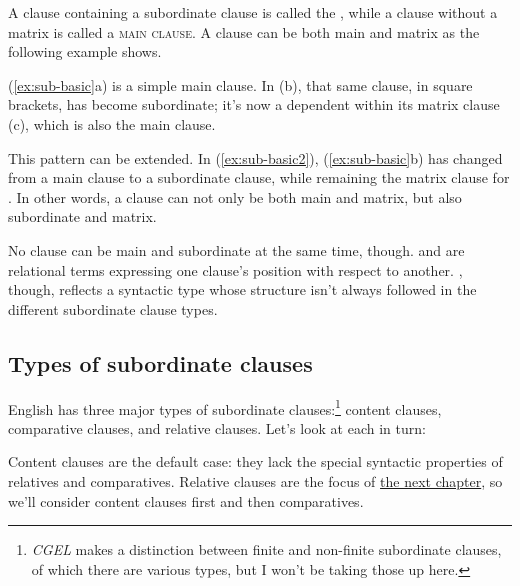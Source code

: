 A clause containing a subordinate clause is called the , while a clause without a matrix is called a \textsc{main clause.} A clause can be both main and matrix as the following example shows.

\ea \label{ex:sub-basic}
    \z
\z
(\ref{ex:sub-basic}a) is a simple main clause. In (b), that same clause, in square brackets, has become subordinate; it's now a dependent within its matrix clause (c), which is also the main clause.

This pattern can be extended. In (\ref{ex:sub-basic2}), (\ref{ex:sub-basic}b) has changed from a main clause to a subordinate clause, while remaining the matrix clause for . In other words, a clause can not only be both main and matrix, but also subordinate and matrix.

\label{ex:sub-basic2}
\z
No clause can be main and subordinate at the same time, though.  and  are relational terms expressing one clause's position with respect to another. , though, reflects a syntactic type whose structure isn't always followed in the different subordinate clause types.

\subsection{Types of subordinate clauses}

English has three major types of subordinate clauses:\footnote{\textit{CGEL} makes a distinction between finite and non-finite subordinate clauses, of which there are various types, but I won't be taking those up here.} content clauses, comparative clauses, and relative clauses. Let's look at each in turn:

\ea \label{ex:sub-types}
    \z
\z
Content clauses are the default case: they lack the special syntactic properties of relatives and comparatives. Relative clauses are the focus of \hyperref[ch:relatives]{the next chapter}, so we'll consider content clauses first and then comparatives.

